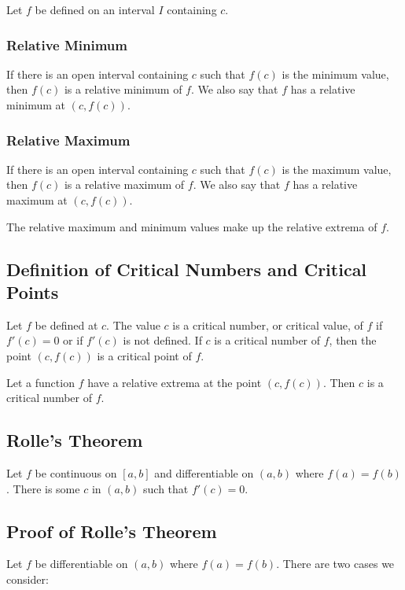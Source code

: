 \documentclass[12pt]{article}
\begin{document}
Let $f$ be defined on an interval $I$ containing $c$. 

\subsubsection{Relative Minimum}
If there is an open interval containing $c$ such that $f(c)$ is the minimum value, then $f(c)$ is a relative minimum of $f$. We also say that $f$ has a relative minimum at $(c, f(c))$.


\subsubsection{Relative Maximum}
If there is an open interval containing $c$ such that $f(c)$ is the maximum value, then $f(c)$ is a relative maximum of $f$. We also say that $f$ has a relative maximum at $(c, f(c))$.

The relative maximum and minimum values make up the relative extrema of $f$.

\subsection{Definition of Critical Numbers and Critical Points}

Let $f$ be defined at $c$. The value $c$ is a critical number, or critical value, of $f$ if $f'(c) = 0$ or if $f'(c)$ is not defined. If $c$ is a critical number of $f$, then the point $(c,f(c))$ is a critical point of $f$. 

Let a function $f$ have a relative extrema at the point $(c,f(c))$. Then $c$ is a critical number of $f$. 


 \subsection{Rolle's Theorem}

 Let $f$ be continuous on $[a,b]$ and differentiable on $(a,b)$ where $f(a) = f(b)$. There is some $c$ in $(a,b)$ such that $f'(c) = 0$. 

 \subsection{Proof of Rolle's Theorem}

 Let $f$ be differentiable on $(a,b)$ where $f(a) = f(b)$. There are two cases we consider:
\end{document}
